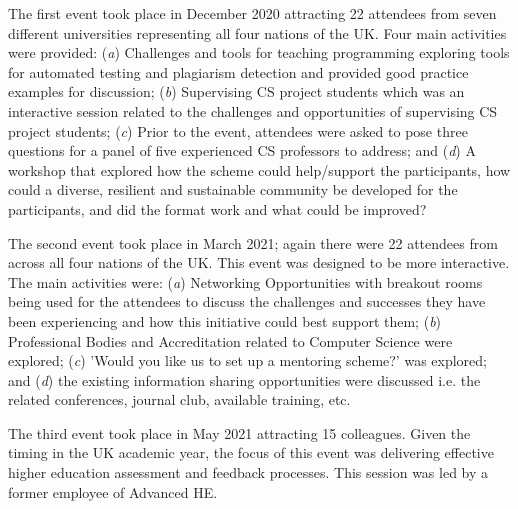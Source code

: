 \documentclass[sigconf]{acmart}
\begin{document}
\begin{comment}
The scheme was formally initiated in December 2020. To date three
developmental/networking events have been delivered online, primarily
due to the impacts of the ongoing COVID-19 pandemic. Alternative
approaches would have been considered in other circumstances. However
many of the participants at the workshops highlighted that due to
competing work-pressures and expense issues they preferred the adopted
virtual format. Following each event, feedback was sought by a
post-event survey; the outcomes of these surveys are explored in
section~\ref{Sec:DoesItWork}.
\end{comment}
The first event took place in December 2020 attracting 22 attendees
from seven different universities representing all four nations of the
UK. Four main activities were provided: ({\emph{a}}) Challenges and
tools for teaching programming exploring tools for automated testing
and plagiarism detection and provided good practice examples for
discussion; ({\emph{b}}) Supervising CS project students which was an
interactive session related to the challenges and opportunities of
supervising CS project students; ({\emph{c}}) Prior to the event,
attendees were asked to pose three questions for a panel of five
experienced CS professors to address; and ({\emph{d}}) A workshop that
explored how the scheme could help/support the participants, how could
a diverse, resilient and sustainable community be developed for the
participants, and did the format work and what could be improved?

The second event took place in March 2021; again there were 22
attendees from across all four nations of the UK. This event was
designed to be more
interactive. The main activities were: ({\emph{a}})
Networking Opportunities with breakout rooms being used for the
attendees to discuss the challenges and successes they have been
experiencing and how this initiative could best support them;
({\emph{b}}) Professional Bodies and Accreditation related to Computer
Science were explored; ({\emph{c}}) 'Would you like us to set up a
mentoring scheme?' was explored; and ({\emph{d}}) the existing
information sharing opportunities were discussed i.e. the related
conferences, journal club, available training, etc.

The third event took place in May 2021 attracting 15 colleagues. Given
the timing in the UK academic year, the focus of this event was
delivering effective higher education assessment and feedback
processes. This session was led by a former employee of Advanced
HE. 
\end{document}
